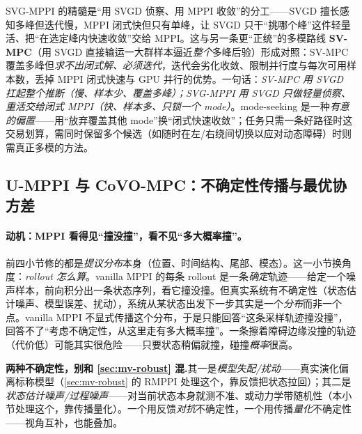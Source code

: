 \begin{insight}
SVG-MPPI 的精髓是“用 SVGD 侦察、用 MPPI 收敛”的分工——SVGD 擅长感知多峰但迭代慢，MPPI 闭式快但只有单峰，让 SVGD 只干“挑哪个峰”这件轻量活、把“在选定峰内快速收敛”交给 MPPI。这与另一条更“正统”的多模路线 \textbf{SV-MPC}\cite{lambert2020svmpc}（用 SVGD 直接输运一大群样本逼近\emph{整个}多峰后验）形成对照：SV-MPC 覆盖多峰但\emph{求不出闭式解、必须迭代}，迭代会劣化收敛、限制并行度与每次可用样本数，丢掉 MPPI 闭式快速与 GPU 并行的优势。一句话：\emph{SV-MPC 用 SVGD 扛起整个推断（慢、样本少、覆盖多峰）；SVG-MPPI 用 SVGD 只做轻量侦察、重活交给闭式 MPPI（快、样本多、只锁一个 mode）}。mode-seeking 是一种\emph{有意的偏置}——用“放弃覆盖其他 mode”换“闭式快速收敛”；任务只需一条好路径时这交易划算，需同时保留多个候选（如随时在左/右绕间切换以应对动态障碍）时则需真正多模的方法。
\end{insight}

\subsection{U-MPPI 与 CoVO-MPC：不确定性传播与最优协方差}
\label{sec:mv-umppi}

\paragraph{动机：MPPI 看得见“撞没撞”，看不见“多大概率撞”。}
前四小节修的都是\emph{提议分布}本身（位置、时间结构、尾部、模态）。这一小节换角度：\emph{rollout 怎么算}。vanilla MPPI 的每条 rollout 是一条\emph{确定}轨迹——给定一个噪声样本，前向积分出一条状态序列，看它撞没撞。但真实系统有不确定性（状态估计噪声、模型误差、扰动），系统从某状态出发下一步其实是一个\emph{分布}而非一个点。vanilla MPPI 不显式传播这个分布，于是只能回答“这条采样轨迹撞没撞”，回答不了“考虑不确定性，从这里走有多大概率撞”。一条擦着障碍边缘没撞的轨迹（代价低）可能其实很危险——只要状态稍偏就撞，碰撞\emph{概率}很高。

\begin{note}
\textbf{两种不确定性，别和 \cref{sec:mv-robust} 混.}\;其一是\emph{模型失配/扰动}——真实演化偏离标称模型（\cref{sec:mv-robust} 的 RMPPI 处理这个，靠反馈把状态拉回）；其二是\emph{状态估计噪声/过程噪声}——对当前状态本身就测不准、或动力学带随机性（本小节处理这个，靠传播量化）。一个用反馈\emph{对抗}不确定性，一个用传播\emph{量化}不确定性——视角互补，也能叠加。
\end{note}

